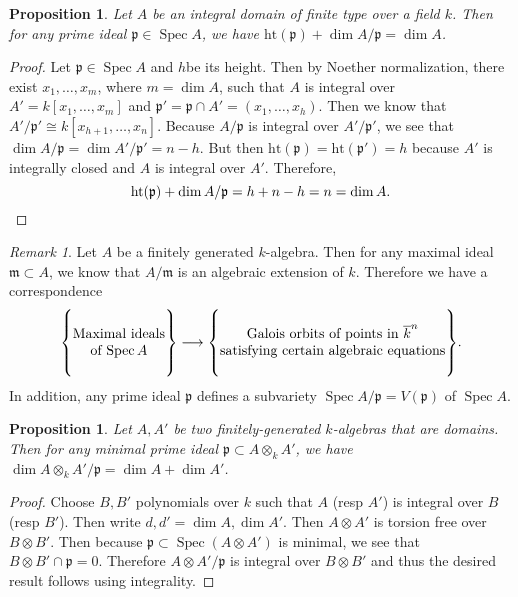 \documentclass[leqno, openany]{memoir}
\newtheorem{prop}[thm]{Proposition}
\theoremstyle{definition}
\theoremstyle{remark}
\newtheorem{rmk}[thm]{Remark}
\theoremstyle{plain}
\theoremstyle{definition}
\theoremstyle{remark}
\newcommand{\mf}[1]{\mathfrak{#1}}
\newcommand{\mr}[1]{\mathrm{#1}}
\newcommand{\ol}[1]{\overline{#1}}
\DeclareMathOperator{\Spec}{Spec}
\begin{document}
\begin{prop}
    Let $A$ be an integral domain of finite type over a field $k$. Then for any prime ideal $\mf{p} \in \Spec A$, we have $\mr{ht}(\mf{p}) + \dim A/\mf{p} = \dim A$.
\end{prop}

\begin{proof}
    Let $\mf{p} \in \Spec A$ and $h$be its height. Then by Noether normalization, there exist $x_1, \ldots, x_m$, where $m = \dim A$, such that $A$ is integral over $A' = k[x_1, \ldots, x_m]$ and $\mf{p}' = \mf{p} \cap A' = (x_1, \ldots, x_h)$. Then we know that $A'/\mf{p}' \cong k[x_{h+1}, \ldots, x_n]$. Because $A/\mf{p}$ is integral over $A'/\mf{p}'$, we see that $\dim A/\mf{p} = \dim A'/\mf{p}' = n-h$. But then $\mr{ht}(\mf{p}) = \mr{ht}(\mf{p}') = h$ because $A'$ is integrally closed and $A$ is integral over $A'$. Therefore,
    \[ \mr{ht}(\mf{p}) + \dim A/\mf{p} = h + n-h = n = \dim A. \qedhere \]
\end{proof}

\begin{rmk}
    Let $A$ be a finitely generated $k$-algebra. Then for any maximal ideal $\mf{m} \subset A$, we know that $A / \mf{m}$ is an algebraic extension of $k$. Therefore we have a correspondence
    \[ \qty{ \Centerstack{ {Maximal ideals} {of $\Spec A$} } } \longrightarrow \qty{\Centerstack{ {Galois orbits of points in $\ol{k}^n$} {satisfying certain algebraic equations} }}. \]
    In addition, any prime ideal $\mf{p}$ defines a subvariety $\Spec A/\mf{p} = V(\mf{p})$ of $\Spec A$.
\end{rmk}

\begin{prop}
    Let $A,A'$ be two finitely-generated $k$-algebras that are domains. Then for any minimal prime ideal $\mf{p} \subset A \otimes_k A'$, we have $\dim A \otimes_k A' / \mf{p} = \dim A + \dim A'$.
\end{prop}

\begin{proof}
    Choose $B,B'$ polynomials over $k$ such that $A$ (resp $A'$) is integral over $B$ (resp $B'$). Then write $d,d' = \dim A, \dim A'$. Then $A \otimes A'$ is torsion free over $B \otimes B'$. Then because $\mf{p} \subset \Spec (A \otimes A')$ is minimal, we see that $B \otimes B' \cap \mf{p} = 0$. Therefore $A \otimes A' / \mf{p}$ is integral over $B \otimes B'$ and thus the desired result follows using integrality.
\end{proof}
\end{document}
